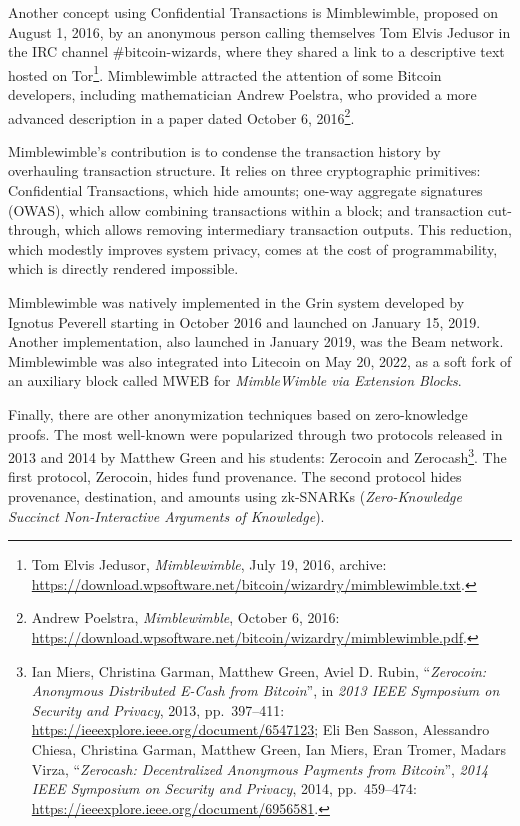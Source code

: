 \documentclass[
  a5paper,
  smalldemyvopaper,10pt,twoside,onecolumn,openright,extrafontsizes,hidelinks]{memoir}
\begin{document}
Another concept using Confidential Transactions is Mimblewimble,
proposed on August 1, 2016, by an anonymous person calling themselves
Tom Elvis Jedusor in the IRC channel \#bitcoin-wizards, where they
shared a link to a descriptive text hosted on Tor\footnote{Tom Elvis
  Jedusor, \emph{Mimblewimble}, July 19, 2016, archive:
  \url{https://download.wpsoftware.net/bitcoin/wizardry/mimblewimble.txt}.}.
Mimblewimble attracted the attention of some Bitcoin developers,
including mathematician Andrew Poelstra, who provided a more advanced
description in a paper dated October 6, 2016\footnote{Andrew Poelstra,
  \emph{Mimblewimble}, October 6, 2016:
  \url{https://download.wpsoftware.net/bitcoin/wizardry/mimblewimble.pdf}.}.

Mimblewimble's contribution is to condense the transaction history by
overhauling transaction structure. It relies on three cryptographic
primitives: Confidential Transactions, which hide amounts; one-way
aggregate signatures (OWAS), which allow combining transactions within a
block; and transaction cut-through, which allows removing intermediary
transaction outputs. This reduction, which modestly improves system
privacy, comes at the cost of programmability, which is directly
rendered impossible.

Mimblewimble was natively implemented in the Grin system developed by
Ignotus Peverell starting in October 2016 and launched on January 15,
2019. Another implementation, also launched in January 2019, was the
Beam network. Mimblewimble was also integrated into Litecoin on May 20,
2022, as a soft fork of an auxiliary block called MWEB for
\emph{MimbleWimble via Extension Blocks}.

Finally, there are other anonymization techniques based on
zero-knowledge proofs. The most well-known were popularized through two
protocols released in 2013 and 2014 by Matthew Green and his students:
Zerocoin and Zerocash\footnote{Ian Miers, Christina Garman, Matthew
  Green, Aviel D. Rubin, ``\emph{Zerocoin: Anonymous Distributed E-Cash
  from Bitcoin}'', in \emph{2013 IEEE Symposium on Security and
  Privacy}, 2013, pp.~397--411:
  \url{https://ieeexplore.ieee.org/document/6547123}; Eli Ben Sasson,
  Alessandro Chiesa, Christina Garman, Matthew Green, Ian Miers, Eran
  Tromer, Madars Virza, ``\emph{Zerocash: Decentralized Anonymous
  Payments from Bitcoin}'', \emph{2014 IEEE Symposium on Security and
  Privacy}, 2014, pp.~459--474:
  \url{https://ieeexplore.ieee.org/document/6956581}.}. The first
protocol, Zerocoin, hides fund provenance. The second protocol hides
provenance, destination, and amounts using zk-SNARKs
(\emph{Zero-Knowledge Succinct Non-Interactive Arguments of Knowledge}).
\end{document}

